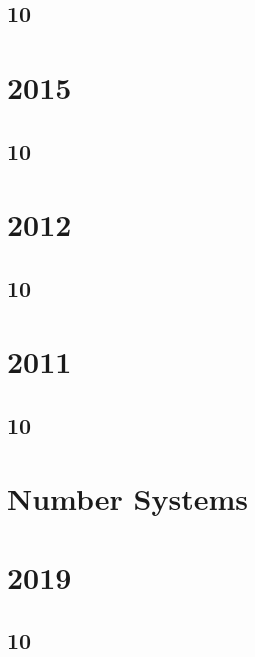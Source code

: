 \subsection{10}

\section{2015}
\subsection{10}


%
\section{2012}
\subsection{10}

\section{2011}
\subsection{10}

%

\section{Number Systems}
\section{2019}
\subsection{10}

